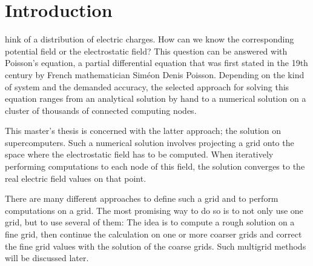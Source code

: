 %
%


\let\textcircled=\pgftextcircled
\chapter{Introduction}
\label{chap:intro}

hink of a distribution of electric charges. How can we know the corresponding potential field or the electrostatic field? This question can be answered with Poisson's equation, a partial differential equation that was first stated in the 19th century by French mathematician Siméon Denis Poisson. Depending on the kind of system and the demanded accuracy, the selected approach for solving this equation ranges from an analytical solution by hand to a numerical solution on a cluster of thousands of connected computing nodes. 

This master's thesis is concerned with the latter approach; the solution on supercomputers. Such a numerical solution involves projecting a grid onto the space where the electrostatic field has to be computed. When iteratively performing computations to each node of this field, the solution converges to the real electric field values on that point. 

There are many different approaches to define such a grid and to perform computations on a grid. The most promising way to do so is to not only use one grid, but to use several of them: The idea is to compute a rough solution on a fine grid, then continue the calculation on one or more coarser grids and correct the fine grid values with the solution of the coarse grids. Such multigrid methods will be discussed later. 

